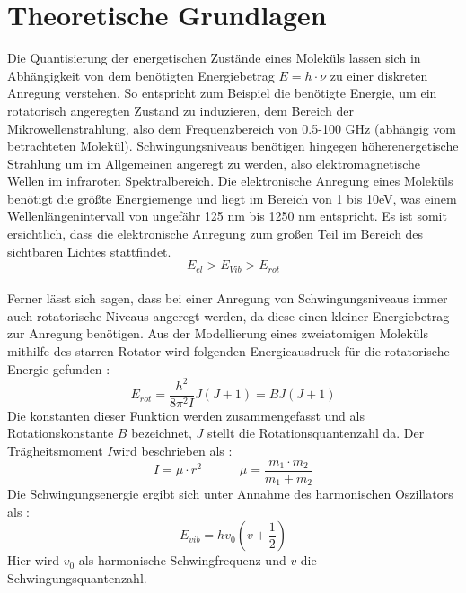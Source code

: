 %
%
\setlength\abovedisplayshortskip{20pt}
\setlength\belowdisplayshortskip{20pt}
\setlength\abovedisplayskip{20pt}
\setlength\belowdisplayskip{20pt}
\section{Theoretische Grundlagen \cite{wedler}}
Die Quantisierung der energetischen Zustände eines Moleküls lassen sich in Abhängigkeit von dem benötigten Energiebetrag $E = h \cdot \nu$ zu einer diskreten Anregung verstehen. So entspricht zum Beispiel die benötigte Energie, um ein rotatorisch angeregten Zustand zu induzieren, dem Bereich der Mikrowellenstrahlung, also dem Frequenzbereich von 0.5-100 GHz (abhängig vom betrachteten Molekül). Schwingungsniveaus benötigen hingegen höherenergetische Strahlung um im Allgemeinen angeregt zu werden, also elektromagnetische Wellen im infraroten Spektralbereich. Die elektronische Anregung eines Moleküls benötigt die größte Energiemenge und liegt im Bereich von 1 bis 10eV, was einem Wellenlängenintervall von ungefähr 125 nm bis 1250 nm entspricht. Es ist somit ersichtlich, dass die elektronische Anregung zum großen Teil im Bereich des sichtbaren Lichtes stattfindet.\\
\begin{equation}
E_{el} > E_{Vib}> E_{rot}
\label{eq:EnergieRating}
\end{equation}
\\
Ferner lässt sich sagen, dass bei einer Anregung von Schwingungsniveaus immer auch rotatorische Niveaus angeregt werden, da diese einen kleiner Energiebetrag zur Anregung benötigen. Aus der Modellierung eines zweiatomigen Moleküls mithilfe des starren Rotator wird folgenden Energieausdruck für die rotatorische Energie gefunden : 
\begin{equation}
E_{rot}= \frac{h^2}{8 \pi^2 I} J(J+1) = BJ(J+1)
\end{equation}
Die konstanten dieser Funktion werden zusammengefasst und als Rotationskonstante $B$ bezeichnet, $J$ stellt die Rotationsquantenzahl da. Der Trägheitsmoment $I$wird beschrieben als : \begin{equation}
	I = \mu \cdot r^2 \quad\quad\quad \mu = \frac{m_1\cdot m_2}{m_1+m_2}
\end{equation} 
Die Schwingungsenergie ergibt sich unter Annahme des harmonischen Oszillators als :
\begin{equation}
E_{vib} = hv_0 \left(v+\frac{1}{2}\right)
\end{equation}
Hier wird $v_0$ als harmonische Schwingfrequenz und $v$ die Schwingungsquantenzahl. 
